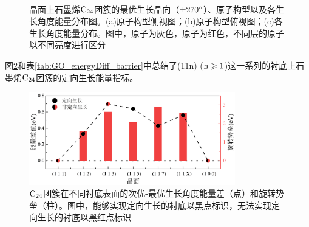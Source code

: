 \begin{figure}[htb]
    \\
    \caption{晶面上石墨烯$\rm{C_{24}}$团簇的最优生长晶向（$\SI{\pm 270}{\degree}$）、原子构型以及各生长角度能量分布图。(a)原子构型侧视图；(b)原子构型俯视图；(c)各生长角度能量分布。图中，原子为灰色，原子为红色，不同层的原子以不同亮度进行区分}
    \label{GO_C24_113}
\end{figure}


图\ref{fig:GO_C24_energyDiff_barrier}和表\ref{tab:GO_energyDiff_barrier}中总结了(11n) ($\rm{n \geqslant 1}$)这一系列的衬底上石墨烯$\rm{C_{24}}$团簇的定向生长能量指标。

\begin{figure}[htb]
    \includegraphics[width=0.8\textwidth]{pic/GO_C24_energyDiff_barrier.png}
    \caption{$\rm{C_{24}}$团簇在不同衬底表面的次优-最优生长角度能量差（点）和旋转势垒（柱）。图中，能够实现定向生长的衬底以黑点标识，无法实现定向生长的衬底以黑红点标识}
    \label{fig:GO_C24_energyDiff_barrier}
\end{figure}

